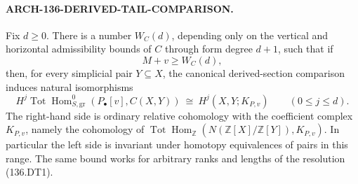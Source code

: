 \paragraph{ARCH-136-DERIVED-TAIL-COMPARISON.}
Fix \(d\geq0\). There is a number \(W_C(d)\), depending only
on the vertical and horizontal admissibility bounds of \(C\)
through form degree \(d+1\), such that if
\[
                         M+v\geq W_C(d),               \tag{136.DT5}
\]
then, for every simplicial pair \(Y\subseteq X\), the canonical
derived-section comparison induces natural isomorphisms
\[
 H^j\operatorname{Tot}\operatorname{Hom}^{0}_{S,\mathrm{gr}}
                 (P_\bullet[v],C(X,Y))
       \ \cong\ H^j(X,Y;K_{P,v})\qquad(0\leq j\leq d).
                                                        \tag{136.DT6}
\]
The right-hand side is ordinary relative cohomology with the
coefficient complex \(K_{P,v}\), namely the cohomology of
\(\operatorname{Tot}\operatorname{Hom}_{\mathbb Z}
(N(\mathbb Z[X]/\mathbb Z[Y]),K_{P,v})\).
In particular the left side is invariant under homotopy equivalences
of pairs in this range. The same bound works for arbitrary ranks
and lengths of the resolution (136.DT1).

